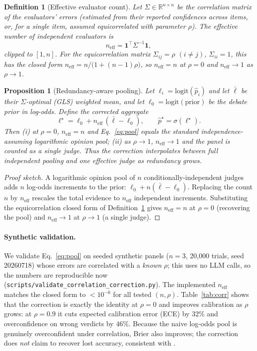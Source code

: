 \documentclass[11pt]{article}
\newtheorem{proposition}{Proposition}
\newtheorem{definition}{Definition}
\newcommand{\neff}{n_{\mathrm{eff}}}
\begin{document}
\begin{definition}[Effective evaluator count]\label{def:neff}
Let $\Sigma\in\mathbb{R}^{n\times n}$ be the correlation matrix of the
evaluators' errors (estimated from their reported confidences across items, or,
for a single item, assumed equicorrelated with parameter $\rho$). The effective
number of independent evaluators is
\begin{equation}
\neff = \mathbf{1}^\top \Sigma^{-1}\mathbf{1},
\end{equation}
clipped to $[1,n]$. For the equicorrelation matrix
$\Sigma_{ij}=\rho$ $(i\neq j)$, $\Sigma_{ii}=1$, this has the closed form
$\neff = n/\big(1+(n-1)\rho\big)$, so $\neff=n$ at $\rho=0$ and $\neff\to 1$ as
$\rho\to 1$.
\end{definition}

\begin{proposition}[Redundancy-aware pooling]\label{prop:correction}
Let $\ell_i=\mathrm{logit}(\hat p_i)$ and let $\bar\ell$ be their
$\Sigma$-optimal (GLS) weighted mean, and let $\ell_0=\mathrm{logit}(\mathrm{prior})$
be the debate prior in log-odds. Define the corrected aggregate
\begin{equation}\label{eq:pool}
\ell^\star = \ell_0 + \neff\,(\bar\ell-\ell_0),\qquad
\hat p^\star=\sigma(\ell^\star).
\end{equation}
Then (i) at $\rho=0$, $\neff=n$ and Eq.~\eqref{eq:pool} equals the standard
independence-assuming logarithmic opinion pool; (ii) as $\rho\to 1$, $\neff\to1$
and the panel is counted as a single judge. Thus the correction interpolates
between full independent pooling and one effective judge as redundancy grows.
\end{proposition}
\begin{proof}[Proof sketch]
A logarithmic opinion pool of $n$ conditionally-independent judges adds $n$
log-odds increments to the prior: $\ell_0+n(\bar\ell-\ell_0)$. Replacing the
count $n$ by $\neff$ rescales the total evidence to $\neff$ independent
increments. Substituting the equicorrelation closed form of
Definition~\ref{def:neff} gives $\neff=n$ at $\rho=0$ (recovering the pool) and
$\neff\to1$ at $\rho\to1$ (a single judge).
\end{proof}

\paragraph{Synthetic validation.} We validate Eq.~\eqref{eq:pool} on seeded
synthetic panels ($n=3$, 20{,}000 trials, seed 20260718) whose errors are
correlated with a \emph{known} $\rho$; this uses no LLM calls, so the numbers are
reproducible now (\texttt{scripts/validate\_correlation\_correction.py}). The
implemented $\neff$ matches the closed form to $<10^{-6}$ for all tested
$(n,\rho)$. Table~\ref{tab:corr} shows that the correction is exactly the
identity at $\rho=0$ and improves calibration as $\rho$ grows: at $\rho=0.9$ it
cuts expected calibration error (ECE) by $32\%$ and overconfidence on wrong
verdicts by $46\%$. Because the naive log-odds pool is genuinely overconfident
under correlation, Brier also improves; the correction does \emph{not} claim to
recover lost accuracy, consistent with \citet{kohli2026}.
\end{document}
